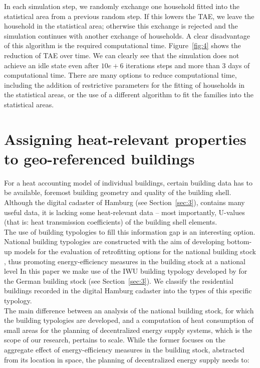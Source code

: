 \documentclass[11pt]{IJM-article}
\begin{document}
In each simulation step, we randomly exchange one household fitted into the
statistical area from a previous random step. If this lowers the TAE, we leave
the household in the statistical area; otherwise this exchange is rejected and
the simulation continues with another exchange of households. A clear
disadvantage of this algorithm is the required computational time.
Figure~\ref{fig:4} shows the reduction of TAE over time. We can clearly see
that the simulation does not achieve an idle state even after $10e+6$
iterations steps and more than 3 days of computational time. There are many
options to reduce computational time, including the addition of restrictive
parameters for the fitting of households in the statistical areas, or the use
of a different algorithm to fit the families into the statistical areas.\\

\section{Assigning heat-relevant properties to geo-referenced buildings}
\label{sec:6}

For a heat accounting model of individual buildings, certain building data has
to be available, foremost building geometry and quality of the building shell.
Although the digital cadaster of Hamburg (see Section~\ref{sec:3}), contains
many useful data, it is lacking some heat-relevant data – most importantly,
U-values (that is: heat transmission coefficients) of the building shell
elements.\\

The use of building typologies to fill this information gap is an interesting
option. National building typologies are constructed with the aim of developing
bottom-up models for the evaluation of retrofitting options for the national
building stock \cite{TABULAProjectTeam.2012b}, thus promoting energy-efficiency
measures in the building stock at a national level  In this paper we make use of the IWU building
typology developed by  for the German building stock (see
Section~\ref{sec:3}). We classify the residential buildings recorded in the
digital Hamburg cadaster into the types of this specific typology.\\

The main difference between an analysis of the national building stock, for
which the building typologies are developed, and a computation of heat
consumption of small areas for the planning of decentralized energy supply
systems, which is the scope of our research, pertains to scale.  While the
former focuses on the aggregate effect of energy-efficiency measures in the
building stock, abstracted from its location in space, the planning of
decentralized energy supply needs to:\\
\end{document}
